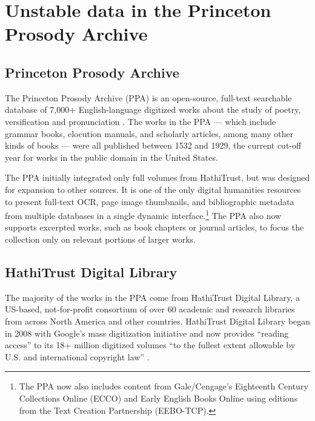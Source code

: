 \documentclass[final]{anthology-ch} %
\begin{document}
\section{Unstable data in the Princeton Prosody Archive}

\subsection{Princeton Prosody Archive }

The Princeton Prosody Archive (PPA) is an open-source, full-text searchable database of 7,000+ English-language digitized works about the study of poetry, versification and pronunciation \cite{noauthor_princeton_nodate}. The works in the PPA — which include grammar books, elocution manuals, and scholarly articles, among many other kinds of books — were all published between 1532 and 1929, the current cut-off year for works in the public domain in the United States.

The PPA initially integrated only full volumes from HathiTrust, but was designed for expansion to other sources. It is one of the only digital humanities resources to present full-text OCR, page image thumbnails, and bibliographic metadata from multiple databases in a single dynamic interface.\footnote{The PPA now also includes content from Gale/Cengage’s Eighteenth Century Collections Online (ECCO) and Early English Books Online using editions from the Text Creation Partnership (EEBO-TCP).} The PPA also now supports excerpted works, such as book chapters or journal articles, to focus the collection only on relevant portions of larger works.

\subsection{HathiTrust Digital Library}

The majority of the works in the PPA come from HathiTrust Digital Library, a US-based, not-for-profit consortium of over 60 academic and research libraries from across North America and other countries. HathiTrust Digital Library began in 2008 with Google’s mass digitization initiative and now provides ``reading access'' to its 18+ million digitized volumes ``to the fullest extent allowable by U.S. and international copyright law'' \cite{noauthor_welcome_nodate}.
\end{document}
